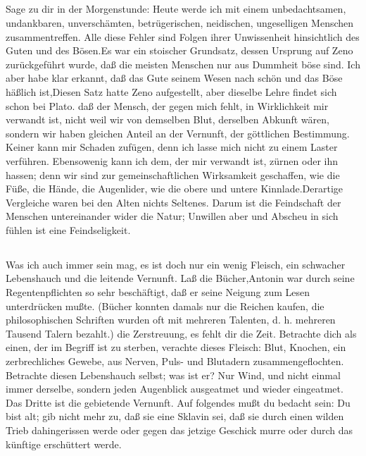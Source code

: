\documentclass[12pt,ngerman,parskip=full]{scrartcl}
\newcounter{abschnitt}
\newcommand{\abschnitt}{\subsection*{\theabschnitt}\stepcounter{abschnitt}}
\begin{document}
\abschnitt

Sage zu dir in der Morgenstunde: Heute werde ich mit einem unbedachtsamen, undankbaren, unverschämten, betrügerischen, neidischen, ungeselligen Menschen zusammentreffen. Alle diese Fehler sind Folgen ihrer Unwissenheit hinsichtlich des Guten und des Bösen.Es war ein stoischer Grundsatz, dessen Ursprung auf Zeno zurückgeführt wurde, daß die meisten Menschen nur aus Dummheit böse sind. Ich aber habe klar erkannt, daß das Gute seinem Wesen nach schön und das Böse häßlich ist,Diesen Satz hatte Zeno aufgestellt, aber dieselbe Lehre findet sich schon bei Plato. daß der Mensch, der gegen mich fehlt, in Wirklichkeit mir verwandt ist, nicht weil wir von demselben Blut, derselben Abkunft wären, sondern wir haben gleichen Anteil an der Vernunft, der göttlichen Bestimmung. Keiner kann mir Schaden zufügen, denn ich lasse mich nicht zu einem Laster verführen. Ebensowenig kann ich dem, der mir verwandt ist, zürnen oder ihn hassen; denn wir sind zur gemeinschaftlichen Wirksamkeit geschaffen, wie die Füße, die Hände, die Augenlider, wie die obere und untere Kinnlade.Derartige Vergleiche waren bei den Alten nichts Seltenes. Darum ist die Feindschaft der Menschen untereinander wider die Natur; Unwillen aber und Abscheu in sich fühlen ist eine Feindseligkeit.

\abschnitt

Was ich auch immer sein mag, es ist doch nur ein wenig Fleisch, ein schwacher Lebenshauch und die leitende Vernunft. Laß die Bücher,Antonin war durch seine Regentenpflichten so sehr beschäftigt, daß er seine Neigung zum Lesen unterdrücken mußte. (Bücher konnten damals nur die Reichen kaufen, die philosophischen Schriften wurden oft mit mehreren Talenten, d. h. mehreren Tausend Talern bezahlt.) die Zerstreuung, es fehlt dir die Zeit. Betrachte dich als einen, der im Begriff ist zu sterben, verachte dieses Fleisch: Blut, Knochen, ein zerbrechliches Gewebe, aus Nerven, Puls- und Blutadern zusammengeflochten. Betrachte diesen Lebenshauch selbst; was ist er? Nur Wind, und nicht einmal immer derselbe, sondern jeden Augenblick ausgeatmet und wieder eingeatmet. Das Dritte ist die gebietende Vernunft. Auf folgendes mußt du bedacht sein: Du bist alt; gib nicht mehr zu, daß sie eine Sklavin sei, daß sie durch einen wilden Trieb dahingerissen werde oder gegen das jetzige Geschick murre oder durch das künftige erschüttert werde.

\abschnitt
\end{document}
